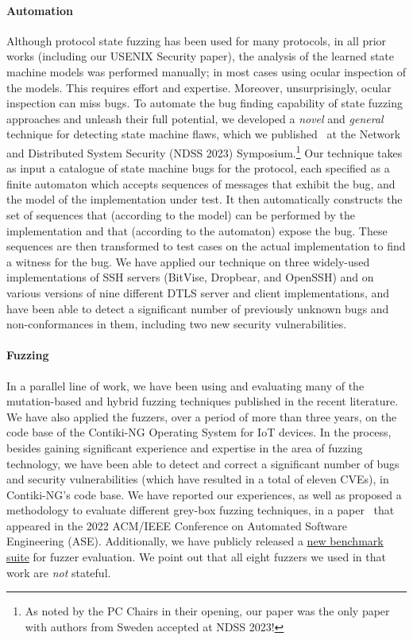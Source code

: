 \documentclass[11pt]{article}
\newcommand{\myparagraph}{}
\let\myparagraph=\paragraph
\renewcommand{\paragraph}{\vspace{-3mm}\myparagraph}
\begin{document}
\paragraph{Automation}
Although protocol state fuzzing has been used for many protocols, in all prior
works (including our USENIX Security paper), the analysis of the learned state
machine models was performed manually; in most cases using ocular inspection
of the models.  This requires effort and expertise.  Moreover, unsurprisingly,
ocular inspection can miss bugs.  To automate the bug finding capability of
state fuzzing approaches and unleash their full potential, we developed a
\emph{novel} and \emph{general} technique for detecting state machine flaws,
which we published~\cite{AutomataBased@NDSS-23} at the Network and Distributed
System Security (NDSS 2023) Symposium.\footnote{As noted by the PC Chairs in
their opening, our paper was the only paper with authors from Sweden accepted
at NDSS 2023!}
%
Our technique takes as input a catalogue of state machine bugs for the
protocol, each specified as a finite automaton which accepts sequences of
messages that exhibit the bug, and the model of the implementation under
test. It then automatically constructs the set of sequences that (according to
the model) can be performed by the implementation and that (according to the
automaton) expose the bug. These sequences are then transformed to test cases
on the actual implementation to find a witness for the bug. We have applied
our technique on three widely-used implementations of SSH servers (BitVise,
Dropbear, and OpenSSH) and on various versions of nine different DTLS server
and client implementations, and have been able to detect a significant number
of previously unknown bugs and non-conformances in them, including two new
security vulnerabilities.

\paragraph{Fuzzing}
In a parallel line of work, we have been using and evaluating many of the
mutation-based and hybrid fuzzing techniques published in the recent
literature. We have also applied the fuzzers, over a period of more than three
years, on the code base of the Contiki-NG Operating System for IoT devices. In
the process, besides gaining significant experience and expertise in the area
of fuzzing technology, we have been able to detect and correct a significant
number of bugs and security vulnerabilities (which have resulted in a total of
eleven CVEs), in Contiki-NG's code base. We have reported our experiences, as
well as proposed a methodology to evaluate different grey-box fuzzing
techniques, in a paper~\cite{SoManyFuzzers@ASE-22} that appeared in the 2022
ACM/IEEE Conference on Automated Software Engineering (ASE).  Additionally, we
have publicly released a
\href{https://github.com/assist-project/so-many-fuzzers-artifact}{new
  benchmark suite} for fuzzer evaluation.
%
We point out that all eight fuzzers we used in that work are \emph{not}
stateful.
\end{document}
